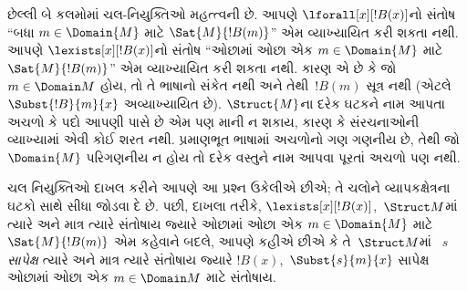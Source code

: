 \begin{explain}
છેલ્લી બે કલમોમાં ચલ-નિયુક્તિઓ
મહત્ત્વની છે. આપણે $\lforall[x][!B(x)]$નો સંતોષ
``બધા $m \in \Domain{M}$ માટે $\Sat{M}{!B(m)}$'' એમ વ્યાખ્યાયિત કરી
શકતા નથી. આપણે $\lexists[x][!B(x)]$નો સંતોષ
``ઓછામાં ઓછા એક $m \in \Domain{M}$ માટે $\Sat{M}{!B(m)}$'' એમ
વ્યાખ્યાયિત કરી શકતા નથી. કારણ એ છે કે જો $m \in \Domain M$ હોય,
તો તે ભાષાનો સંકેત નથી અને તેથી~$!B(m)$ સૂત્ર નથી (એટલે
$\Subst{!B}{m}{x}$ અવ્યાખ્યાયિત છે). $\Struct{M}$ના દરેક ઘટકને
નામ આપતા અચળો કે પદો આપણી પાસે છે એમ પણ માની ન શકાય, કારણ
કે સંરચનાઓની વ્યાખ્યામાં એવી કોઈ શરત નથી. પ્રમાણભૂત ભાષામાં
અચળોનો ગણ ગણનીય છે, તેથી જો $\Domain{M}$
પરિગણનીય ન હોય તો દરેક વસ્તુને નામ આપવા પૂરતાં અચળો પણ
નથી.

ચલ નિયુક્તિઓ દાખલ કરીને આપણે આ પ્રશ્ન ઉકેલીએ છીએ; તે ચલોને વ્યાપકક્ષેત્રના
ઘટકો સાથે સીધા જોડવા દે છે. પછી, દાખલા તરીકે,
$\lexists[x][!B(x)]$,~$\Struct M$માં
ત્યારે અને માત્ર ત્યારે સંતોષાય જ્યારે
ઓછામાં ઓછા એક $m \in \Domain{M}$ માટે
$\Sat{M}{!B(m)}$ એમ કહેવાને બદલે, આપણે કહીએ છીએ કે તે~$\Struct M$માં
~$s$ \emph{સાપેક્ષ} ત્યારે અને માત્ર ત્યારે સંતોષાય જ્યારે
$!B(x)$,~$\Subst{s}{m}{x}$ સાપેક્ષ ઓછામાં ઓછા
એક $m \in \Domain M$ માટે સંતોષાય.
\end{explain}

